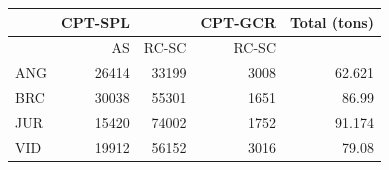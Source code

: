 \documentclass[11pt]{article}
\begin{document}
\begin{center}
\begin{tabular}{lrrrr}
      &  CPT-SPL  &         &  CPT-GCR  &  Total (tons)  \\
\hline
      &       AS  &  RC-SC  &    RC-SC  &                \\
 ANG  &    26414  &  33199  &     3008  &        62.621  \\
 BRC  &    30038  &  55301  &     1651  &         86.99  \\
 JUR  &    15420  &  74002  &     1752  &        91.174  \\
 VID  &    19912  &  56152  &     3016  &         79.08  \\
\end{tabular}
\end{center}
\end{document}
